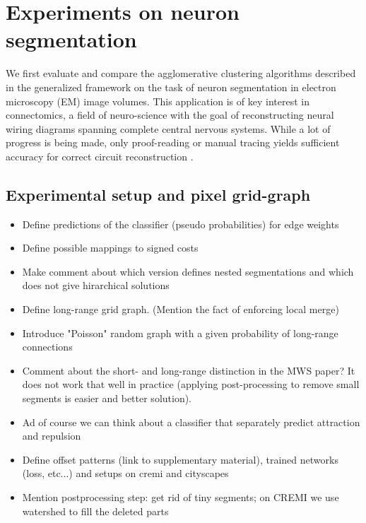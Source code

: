 \section{Experiments on neuron segmentation}

We first evaluate and compare the agglomerative clustering algorithms described in the generalized framework on the task of neuron segmentation in electron microscopy (EM) image volumes. This application is of key interest in connectomics, a field of neuro-science with the goal of reconstructing neural wiring diagrams spanning complete central nervous systems. While a lot of progress is being made, only proof-reading or manual tracing yields sufficient accuracy for correct circuit reconstruction \cite{schlegel2017learning}.

\subsection{Experimental setup and pixel grid-graph} \label{sec:grid_graph}
\begin{itemize}
\item Define predictions of the classifier (pseudo probabilities) for edge weights
\item Define possible mappings to signed costs
\item Make comment about which version defines nested segmentations and which does not give hirarchical solutions

\end{itemize}


\begin{itemize}
    \item Define long-range grid graph. (Mention the fact of enforcing local merge)
\item Introduce "Poisson" random graph with a given probability of long-range connections
\item Comment about the short- and long-range distinction in the MWS paper? It does not work that well in practice (applying post-processing to remove small segments is easier and better solution).
\item Ad of course we can think about a classifier that separately predict attraction and repulsion
\item Define offset patterns (link to supplementary material), trained networks (loss, etc...) and setups on cremi and cityscapes 
\item Mention postprocessing step: get rid of tiny segments; on CREMI we use watershed to fill the deleted parts 
\end{itemize}
